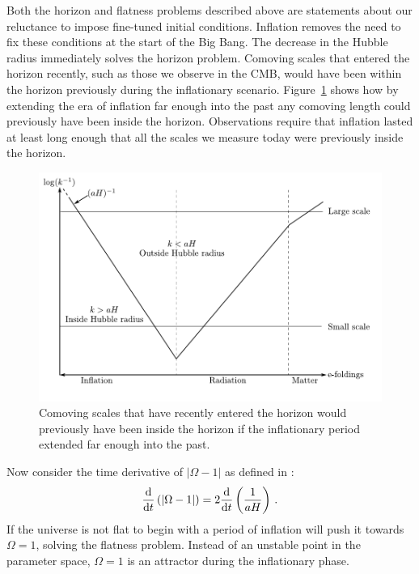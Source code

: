 Both the horizon and flatness problems described above are statements about our
reluctance to impose fine-tuned initial conditions. Inflation removes the need
to fix these conditions at the start of the Big Bang.
The decrease in the Hubble radius immediately solves the horizon problem.
Comoving scales that entered the horizon recently, such as those we observe in
the CMB, would have been within the horizon previously during the inflationary
scenario. Figure~\ref{fig:comovingscales-intro} shows how by extending
the era of inflation far enough into the past any comoving length could
previously have been inside the horizon.
Observations require that inflation lasted at least long enough that all the
scales we measure today were previously inside the horizon. 
% 
\begin{figure}
 \includegraphics[width=\textwidth]{graphs/scales.pdf}
 \caption{Comoving scales that have recently entered the horizon would
previously have been inside the horizon if the inflationary period extended far
enough into the past.}
 \label{fig:comovingscales-intro}
\end{figure}
% 

Now consider the time derivative of $|\Omega -1|$ as defined in
:
% 
\begin{equation}
 \label{eq:omegaderiv-intro}
 \frac{\mathrm{d}}{\mathrm{d} t}\left(|\Omega -1 |\right) = 2\frac{\mathrm{d}}{\mathrm{d} t}
\left(\frac{1}{aH}\right)\,.
\end{equation}
% 
If the universe is not flat to begin with a period of inflation will push it
towards $\Omega=1$, solving the flatness problem. Instead of an unstable point
in the parameter space, $\Omega=1$ is an attractor during the inflationary
phase. 
% 

